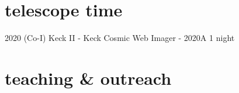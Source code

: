\documentclass[]{luger-cv} %
\begin{document}

\section{telescope time}

\begin{entrylist}
\entry
{2020}
{(Co-I) Keck II - Keck Cosmic Web Imager - 2020A}
{1 night}
{%
\vspace*{-2em}
}
\end{entrylist}

\vspace*{-2mm}
\section{teaching \& outreach}
\end{document}
